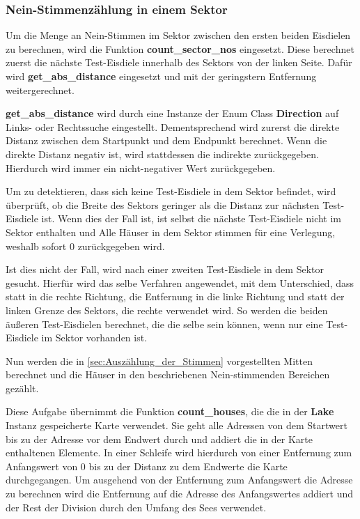 \documentclass[a4paper,10pt,ngerman]{scrartcl}
\begin{document}
\subsubsection{Nein-Stimmenzählung in einem Sektor}
\label{sec:Stimmenzählung_in_einem_Sektor}
Um die Menge an Nein-Stimmen im Sektor zwischen den ersten beiden Eisdielen zu berechnen, wird die Funktion \textbf{count\_sector\_nos} eingesetzt.
Diese berechnet zuerst die nächste Test-Eisdiele innerhalb des Sektors von der linken Seite.
Dafür wird \textbf{get\_abs\_distance} eingesetzt und mit der geringstern Entfernung weitergerechnet.

\medskip
\begin{addmargin}[3em]{4em}
    \textbf{get\_abs\_distance} wird durch eine Instanze der Enum Class \textbf{Direction} auf Links- oder Rechtssuche eingestellt.
    Dementsprechend wird zurerst die direkte Distanz zwischen dem Startpunkt und dem Endpunkt berechnet.
    Wenn die direkte Distanz negativ ist, wird stattdessen die indirekte zurückgegeben.
    Hierdurch wird immer ein nicht-negativer Wert zurückgegeben.
\end{addmargin}

\medskip
Um zu detektieren, dass sich keine Test-Eisdiele in dem Sektor befindet, wird überprüft, ob die Breite des Sektors geringer als die Distanz zur nächsten Test-Eisdiele ist.
Wenn dies der Fall ist, ist selbst die nächste Test-Eisdiele nicht im Sektor enthalten und Alle Häuser in dem Sektor stimmen für eine Verlegung, weshalb sofort $0$ zurückgegeben wird.

Ist dies nicht der Fall, wird nach einer zweiten Test-Eisdiele in dem Sektor gesucht.
Hierfür wird das selbe Verfahren angewendet, mit dem Unterschied, dass statt in die rechte Richtung, die Entfernung in die linke Richtung und statt der linken Grenze des Sektors, die rechte verwendet wird.
So werden die beiden äußeren Test-Eisdielen berechnet, die die selbe sein können, wenn nur eine Test-Eisdiele im Sektor vorhanden ist.

\medskip
Nun werden die in \autoref{sec:Auszählung_der_Stimmen} vorgestellten Mitten berechnet und die Häuser in den beschriebenen Nein-stimmenden Bereichen gezählt.

\medskip
\begin{addmargin}[3em]{4em}
    Diese Aufgabe übernimmt die Funktion \textbf{count\_houses}, die die in der \textbf{Lake} Instanz gespeicherte Karte verwendet.
    Sie geht alle Adressen von dem Startwert bis zu der Adresse vor dem Endwert durch und addiert die in der Karte enthaltenen Elemente.
    In einer Schleife wird hierdurch von einer Entfernung zum Anfangswert von $0$ bis zu der Distanz zu dem Endwerte die Karte durchgegangen.
    Um ausgehend von der Entfernung zum Anfangswert die Adresse zu berechnen wird die Entfernung auf die Adresse des Anfangswertes addiert und der Rest der Division durch den Umfang des Sees verwendet.
\end{addmargin}
\end{document}
